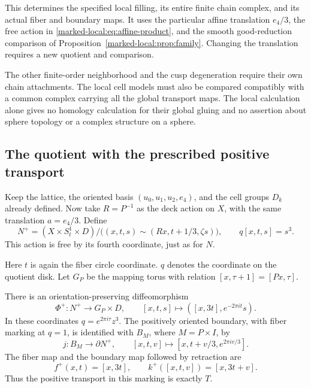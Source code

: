 This determines the specified local filling, its entire finite chain
complex, and its actual fiber and boundary maps. It uses the particular affine
translation $e_4/3$, the free action in \eqref{marked-local:eq:affine-product},
and the smooth good-reduction comparison of
Proposition~\ref{marked-local:prop:family}. Changing the translation requires a
new quotient and comparison.

The other finite-order neighborhood and
the cusp degeneration require their own chain attachments. The local
cell models must also be compared compatibly with a common complex
carrying all the global transport maps. The local
calculation alone gives no homology calculation for their global gluing
and no assertion about sphere topology or a complex structure on a sphere.

\subsection{The quotient with the prescribed positive transport}

Keep the lattice, the oriented basis $(u_0,u_1,u_2,e_4)$, and the
cell groups $D_k$ already defined. Now take $R=P^{-1}$ as the deck
action on $X$, with the same translation $a=e_4/3$. Define
\begin{equation}\label{marked-local:eq:positive-quotient}
 N^+=(X\times S^1_t\times D)/
 \bigl((x,t,s)\sim(Rx,t+1/3,\zeta s)\bigr),
 \qquad q[x,t,s]=s^3.
\end{equation}
This action is free by its fourth coordinate, just as for $N$.

Here $t$ is again the fiber circle coordinate. $q$ denotes the
coordinate on the quotient disk. Let $G_P$ be the mapping torus
with relation $[x,\tau+1]=[Px,\tau]$.

\begin{theorem}\label{marked-local:thm:positive-geometry}
There is an orientation-preserving diffeomorphism
\begin{equation}\label{marked-local:eq:positive-product}
 \Phi^+:N^+\longrightarrow G_P\times D,
 \qquad [x,t,s]\longmapsto([x,3t],e^{-2\pi it}s).
\end{equation}
In these coordinates $q=e^{2\pi i\tau}z^3$.
The positively oriented boundary, with fiber marking at $q=1$,
is identified with $B_M$, where $M=P\times I$, by
\begin{equation}\label{marked-local:eq:positive-native-boundary}
 j:B_M\longrightarrow\partial N^+,
 \qquad [x,t,v]\longmapsto[x,t+v/3,e^{2\pi iv/3}].
\end{equation}
The fiber map and the boundary map followed by retraction are
\begin{equation}\label{marked-local:eq:positive-geometric-maps}
 f^+(x,t)=[x,3t],\qquad
 k^+([x,t,v])=[x,3t+v].
\end{equation}
Thus the positive transport in this marking is exactly $T$.
\end{theorem}

